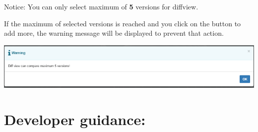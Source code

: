 \begin{boxhint}{Notice:}
   You can only select maximum of \textbf{5} versions for diffview.

   If the maximum of selected versions is reached and you click on the button to 
   add more, the warning message will be displayed to prevent that action.
\end{boxhint}

\includegraphics[width=1\linewidth]{./pictures/diffview/warning.png}

\hypertarget{developer-guidance}{%
\section{Developer guidance:}\label{developer-guidance}}

